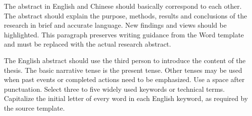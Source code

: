 \begin{enabstract}
The abstract in English and Chinese should basically correspond to each other. The abstract should explain the purpose, methods, results and conclusions of the research in brief and accurate language. New findings and views should be highlighted. This paragraph preserves writing guidance from the Word template and must be replaced with the actual research abstract.

The English abstract should use the third person to introduce the content of the thesis. The basic narrative tense is the present tense. Other tenses may be used when past events or completed actions need to be emphasized. Use a space after punctuation. Select three to five widely used keywords or technical terms. Capitalize the initial letter of every word in each English keyword, as required by the source template.
\end{enabstract}
